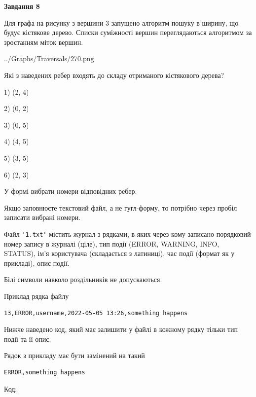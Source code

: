 \documentclass[12pt, ukrainian]{article}
\def\code#1{\Verb!#1!}
\begin{document}
{\begin {large}
{\begin {center}\textbf{Завдання 8}\end {center}}\par
Для графа на рисунку з вершини 3 запущено алгоритм пошуку в ширину, що будує кістякове дерево. Списки суміжності вершин переглядаються алгоритмом за зростанням міток вершин.\par
\begin{center}
	{../Graphs/Traversals/270.png}
\end{center}
\par Які з наведених ребер входять до складу отриманого кістякового дерева?\par
1) (2, 4)\par
2) (0, 2)\par
3) (0, 5)\par
4) (4, 5)\par
5) (3, 5)\par
6) (2, 3)\par
{\vskip 15pt} У формі вибрати номери відповідних ребер.


Якщо заповнюєте текстовий файл, а не гугл-форму, то потрібно через пробіл записа\-ти вибрані номери.\par
\newpage


Файл \code{'1.txt'} містить журнал з рядками, в яких через кому записано поряд\-ко\-вий номер запису в журналі (ціле), тип події (ERROR, WARNING, INFO, STATUS), ім'я користувача (складається з латиниці), час події (фор\-мат як у прикладі), опис події.

Білі символи навколо роздільників не допускаються.

Приклад рядка файлу



\begin{verbatim}
13,ERROR,username,2022-05-05 13:26,something happens
\end{verbatim}


Нижче наведено код, який має залишити у файлі в кожному рядку тільки тип події та її опис.

Рядок з прикладу має бути замінений на такий



\begin{verbatim}
ERROR,something happens
\end{verbatim}




Код:




\end{large}}
\end{document}
